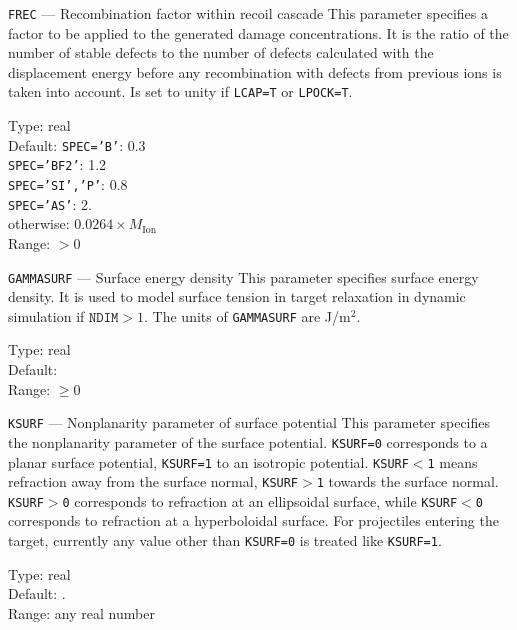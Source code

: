 \begin{keydescription}{\texttt{FREC} --- Recombination factor within
    recoil cascade}
%
  This parameter specifies a factor to be applied to the generated damage 
  concentrations.  It is the ratio of the number of stable defects to
  the number of defects calculated with the displacement energy before
  any recombination with defects from previous ions is taken into
  account.  Is set to unity if \texttt{LCAP=T} or \texttt{LPOCK=T}.
  \begin{keytab}
    Type:    \> real \\
    Default: \> \texttt{SPEC='B'}: 0.3 \\
             \> \texttt{SPEC='BF2'}: 1.2 \\
             \> \texttt{SPEC='SI','P'}: 0.8 \\
             \> \texttt{SPEC='AS'}: 2. \\
             \> otherwise: $0.0264 \times M_\mathrm{Ion}$ \\
    Range:   \> $> 0$
  \end{keytab}
\end{keydescription}

\begin{keydescription}{\texttt{GAMMASURF} --- Surface energy density}
%
  This parameter specifies surface energy density. It is used to model
  surface tension in target relaxation in dynamic simulation if 
  $\texttt{NDIM} > 1$. The units of \texttt{GAMMASURF} are J/m$^2$.
  \begin{keytab}
    Type:    \> real \\
    Default:  \\
    Range:   \> $\ge 0$
  \end{keytab}
\end{keydescription}

\begin{keydescription}{\texttt{KSURF} --- Nonplanarity parameter of surface
potential}
%
  This parameter specifies the nonplanarity parameter of the surface
  potential. \texttt{KSURF=0} corresponds to a planar surface potential,
  \texttt{KSURF=1} to an isotropic potential. \texttt{KSURF$<$1} means
  refraction away from the surface normal, \texttt{KSURF$>$1} towards the
  surface normal. \texttt{KSURF$>$0} corresponds to refraction at an ellipsoidal
  surface, while \texttt{KSURF$<$0} corresponds to refraction at a hyperboloidal
  surface. For projectiles entering the target, currently any value other than
  \texttt{KSURF=0} is treated like \texttt{KSURF=1}.
  \begin{keytab}
    Type:    \> real \\
    Default: . \\
    Range:   \> any real number
  \end{keytab}
\end{keydescription}

